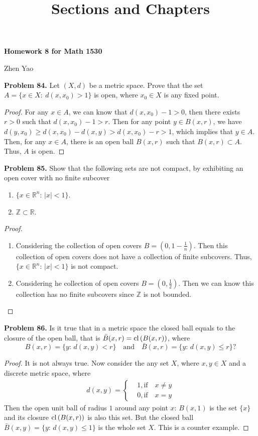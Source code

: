 \documentclass[12pt,leqno]{amsart}
\title{Sections and Chapters}
\theoremstyle{definition}
\numberwithin{equation}{subsection}
\begin{document}
\centerline{\bf Homework 8 for Math 1530}
\centerline{Zhen Yao}

\bigskip

\noindent
{\bf Problem 84.}
Let $(X,d)$ be a metric space. Prove that the set
$
A = \{x\in X:\ d(x,x_0)>1\}
$
is open, where $x_0\in X$ is any fixed point.
\begin{proof}
For any $x\in A$, we can know that $d(x,x_0) - 1 > 0$, then there exists $r > 0$ such that $d(x,x_0) - 1 > r$. Then for any point $y\in B(x,r)$, we have $d(y,x_0) \geq d(x,x_0) - d(x,y) > d(x,x_0) - r > 1$, which implies that $y\in A$. Then, for any $x\in A$, there is an open ball $B(x,r)$ such that $B(x,r)\subset A$. Thus, $A$ is open.
\end{proof}

\medskip

\noindent
{\bf Problem 85.}
Show that the following sets are not compact, by exhibiting an open
cover with no finite subcover
\begin{enumerate}[label=(\alph*)]
 \item $\{ x\in\mathbb{R}^n:\, |x|<1\}$.
 \item $\mathbb{Z}\subset\mathbb{R}$.
\end{enumerate}
\begin{proof}
~\begin{enumerate}[label=(\alph*)]
    \item Considering the collection of open covers $B = \left(0, 1 - \frac{1}{n}\right)$. Then this collection of open covers does not have a collection of finite subcovers. Thus, $\{ x\in\mathbb{R}^n:\, |x|<1\}$ is not compact. 
    \item Considering he collection of open covers $B = \left(0, \frac{1}{2}\right)$. Then we can know this collection has no finite subcovers since $\mathbb{Z}$ is not bounded.
\end{enumerate}
\end{proof}

\medskip

\noindent
{\bf Problem 86.}
Is it true that in a metric space the closed ball equals to the closure of the open ball, that is
$\bar{B}(x,r)={\rm cl}\,(B(x,r))$, where
$$
B(x,r)=\{y:\, d(x,y)< r\}
\quad
\text{and}
\quad
\bar{B}(x,r)=\{y:\, d(x,y)\leq r\}?
$$
\begin{proof}
It is not always true. Now consider the any set $X$, where $x,y\in X$ and a discrete metric space, where
\begin{align*}
    d(x,y) = \left\{
    \begin{aligned}
    & 1, \text{if} \quad x \neq y\\
    & 0, \text{if} \quad x = y
    \end{aligned}
    \right.
\end{align*}
Then the open unit ball of radius $1$ around any point $x$: $B(x,1)$ is the set $\{x\}$ and its closure ${\rm cl}\,(B(x,r))$ is also this set. But the closed ball $\bar{B}(x,y)=\{y:\, d(x,y)\leq 1\}$ is the whole set $X$. This is a counter example. 
\end{proof}
\end{document}
